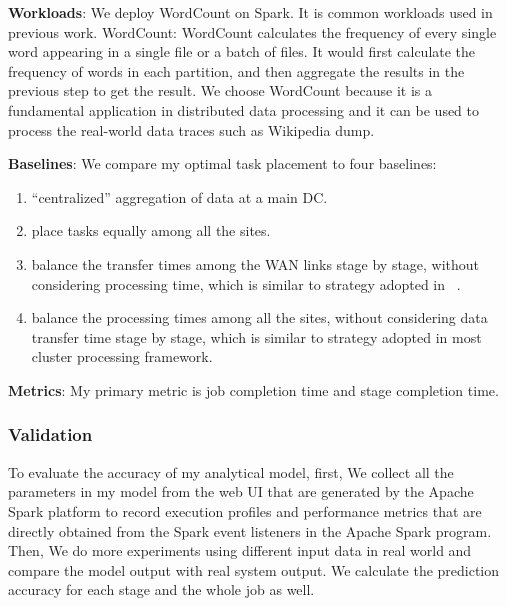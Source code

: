 \documentclass[base.tex]{subfiles}
\begin{document}
\textbf{Workloads}: We deploy WordCount on Spark. It is common workloads used in previous work.
WordCount: WordCount calculates the frequency of every single word appearing in a single file or a batch of files. It would first calculate the frequency of words in each partition, and then aggregate the results in the previous step to get the result. We choose WordCount because it is a fundamental application in distributed data processing and it can be used to process the real-world data traces such as Wikipedia dump.

\textbf{Baselines}: We compare my optimal task placement to four baselines: 
\begin{enumerate}
  \item ``centralized'' aggregation of data at a main DC.
  \item place tasks equally among all the sites.
  \item balance the transfer times among the WAN links stage by stage, without considering processing time, which is similar to strategy adopted in ~\cite{hu2016flutter}.
  \item balance the processing times among all the sites, without considering data transfer time stage by stage, which is similar to strategy adopted in most cluster processing framework.
\end{enumerate}

\textbf{Metrics}: My primary metric is job completion time and stage completion time. \iffalse As the bandwidths of WAN among different datacenters are expensive in terms of cost, so We also take the amount of traffic transferred among different datacenters as another metric, although it is not my main objective. Moreover, We also report the running times of solving the task placement problem in different scales to show the scalability of my approach.\fi

\subsubsection{Validation}
To evaluate the accuracy of my analytical model, first, We collect all the parameters in my model from the web UI that are generated by  the Apache Spark platform to record execution profiles and performance metrics that are directly obtained from the Spark event listeners in the Apache Spark program. Then, We do more experiments using different input data in real world and compare the model output with real system output. We calculate the prediction accuracy for each stage and the whole job as well.
\end{document}
